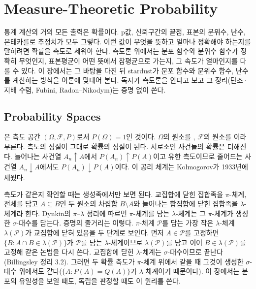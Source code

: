\chapter{Measure-Theoretic Probability}
\label{ch:probability}


통계 계산의 거의 모든 출력은 확률이다. p값, 신뢰구간의 끝점, 표본의 분위수, 난수, 몬테카를로 추정치가 모두 그렇다. 이런 값이 무엇을 뜻하고 얼마나 정확해야 하는지를 말하려면 확률을 측도로 세워야 한다. 측도론 위에서는 분포 함수와 분위수 함수가 정확히 무엇인지, 표본평균이 어떤 뜻에서 참평균으로 가는지, 그 속도가 얼마인지를 다룰 수 있다. 이 장에서는 그 바탕을 다진 뒤 stardust가 분포 함수와 분위수 함수, 난수를 계산하는 방식을 이론에 맞대어 본다. 독자가 측도론을 안다고 보고 그 정리(단조·지배 수렴, Fubini, Radon--Nikodym)는 증명 없이 쓴다.

\section{Probability Spaces}
\label{sec:probability-space}

은 측도 공간 $(\Omega,\mathcal F,P)$로서 $P(\Omega)=1$인 것이다. $\Omega$의 원소를 , $\mathcal F$의 원소를 이라 부른다. 측도의 성질이 그대로 확률의 성질이 된다. 서로소인 사건들의 확률은 더해진다. 늘어나는 사건열 $A_n\uparrow A$에서 $P(A_n)\uparrow P(A)$이고 유한 측도이므로 줄어드는 사건열 $A_n\downarrow A$에서도 $P(A_n)\downarrow P(A)$이다. 이 공리 체계는 Kolmogorov가 1933년에 세웠다\cite{kolmogorov1933}.

측도가 같은지 확인할 때는 생성족에서만 보면 된다. 교집합에 닫힌 집합족을 $\pi$-체계, 전체를 담고 $A\subseteq B$인 두 원소의 차집합 $B\setminus A$와 늘어나는 합집합에 닫힌 집합족을 $\lambda$-체계라 한다. Dynkin의 $\pi$--$\lambda$ 정리에 따르면 $\pi$-체계를 담는 $\lambda$-체계는 그 $\pi$-체계가 생성한 $\sigma$-대수를 담는다. 증명의 줄거리는 이렇다. $\pi$-체계 $\mathcal P$를 담는 가장 작은 $\lambda$-체계 $\lambda(\mathcal P)$가 교집합에 닫혀 있음을 두 단계로 보인다. 먼저 $A\in\mathcal P$를 고정하면 $\{B:A\cap B\in\lambda(\mathcal P)\}$가 $\mathcal P$를 담는 $\lambda$-체계이므로 $\lambda(\mathcal P)$를 담고 이어 $B\in\lambda(\mathcal P)$를 고정해 같은 논법을 다시 쓴다. 교집합에 닫힌 $\lambda$-체계는 $\sigma$-대수이므로 끝난다(Billingsley\cite{billingsley1995} 정리 3.2). 그러면 두 확률 측도가 $\pi$-체계 위에서 같을 때 그것이 생성한 $\sigma$-대수 위에서도 같다($\{A:P(A)=Q(A)\}$가 $\lambda$-체계이기 때문이다). 이 장에서는 분포의 유일성을 보일 때도, 독립을 판정할 때도 이 원리를 쓴다.

